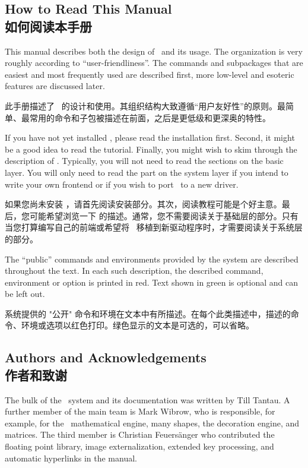 \subsection{How to Read This Manual\\如何阅读本手册}

This manual describes both the design of \tikzname\ and its usage. The
organization is very roughly according to ``user-friendliness''. The commands
and subpackages that are easiest and most frequently used are described first,
more low-level and esoteric features are discussed later.



此手册描述了 \tikzname\ 的设计和使用。其组织结构大致遵循“用户友好性”的原则。最简单、最常用的命令和子包被描述在前面，之后是更低级和更深奥的特性。


If you have not yet installed \tikzname, please read the installation first.
Second, it might be a good idea to read the tutorial. Finally, you might wish
to skim through the description of \tikzname. Typically, you will not need to
read the sections on the basic layer. You will only need to read the part on
the system layer if you intend to write your own frontend or if you wish to
port \pgfname\ to a new driver.

如果您尚未安装 \tikzname，请首先阅读安装部分。其次，阅读教程可能是个好主意。最后，您可能希望浏览一下 \tikzname 的描述。通常，您不需要阅读关于基础层的部分。只有当您打算编写自己的前端或希望将 \pgfname\ 移植到新驱动程序时，才需要阅读关于系统层的部分。

The ``public'' commands and environments provided by the system are described
throughout the text. In each such description, the described command,
environment or option is printed in red. Text shown in green is optional and
can be left out.

系统提供的 "公开" 命令和环境在文本中有所描述。在每个此类描述中，描述的命令、环境或选项以红色打印。绿色显示的文本是可选的，可以省略。




\subsection{Authors and Acknowledgements\\作者和致谢}
\label{section-authors}

The bulk of the \pgfname\ system and its documentation was written by Till
Tantau. A further member of the main team is Mark Wibrow, who is responsible,
for example, for the \pgfname\ mathematical engine, many shapes, the decoration
engine, and matrices. The third member is Christian Feuers\"anger who
contributed the floating point library, image externalization, extended key
processing, and automatic hyperlinks in the manual.

